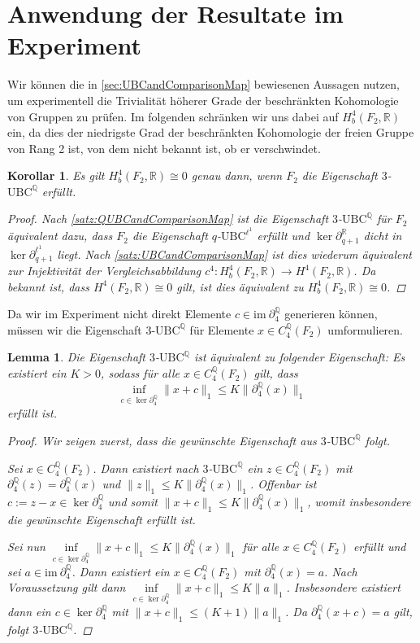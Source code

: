 \documentclass[a4paper,twoside,10pt]{scrreprt}
\newcommand {\img}{\text{im}~}
\newcommand{\Q}{\mathbb{Q}}
\newcommand{\R}{\mathbb{R}}
\newtheorem{lemma}[satz]{Lemma}
\newtheorem{korollar}[satz]{Korollar}
\theoremstyle{definition}
\begin{document}
\section{Anwendung der Resultate im Experiment}
Wir können die in \cref{sec:UBCandComparisonMap} bewiesenen Aussagen nutzen, um experimentell die Trivialität höherer Grade der beschränkten Kohomologie von Gruppen zu prüfen. Im folgenden schränken wir uns dabei auf $H_b^4(F_2,\R)$ ein, da dies der niedrigste Grad der beschränkten Kohomologie der freien Gruppe von Rang 2 ist, von dem nicht bekannt ist, ob er verschwindet.
\begin{korollar} 
Es gilt $H_b^4(F_2,\R)\cong 0$ genau dann, wenn $F_2$ die Eigenschaft $3$-$\text{UBC}^{\Q}$ erfüllt.
\begin{proof}
Nach \cref{satz:QUBCandComparisonMap} ist die Eigenschaft $3$-$\text{UBC}^{\Q}$ für $F_2$ äquivalent dazu, dass $F_2$ die Eigenschaft $q$-$\text{UBC}^{\ell^1}$ erfüllt und $\ker \partial_{q+1}^{\R}$ dicht in $\ker \partial_{q+1}^{\ell^1}$ liegt. Nach \cref{satz:UBCandComparisonMap} ist dies wiederum äquivalent zur Injektivität der Vergleichsabbildung $c^4:H_b^4(F_2,\R)\to H^4(F_2,\R)$. Da bekannt ist, dass $H^4(F_2,\R)\cong 0$ gilt, ist dies äquivalent zu $H_b^4(F_2,\R)\cong 0$.
\end{proof}
\end{korollar}
Da wir im Experiment nicht direkt Elemente $c\in\img\partial_4^{\Q}$ generieren können, müssen wir die Eigenschaft $3$-$\text{UBC}^{\Q}$ für Elemente $x\in C_4^{\Q}(F_2)$ umformulieren. 
\begin{lemma}
Die Eigenschaft $3$-$\text{UBC}^{\Q}$ ist äquivalent zu folgender Eigenschaft:
Es existiert ein $K>0$, sodass für alle $x\in C_4^{\Q}(F_2)$ gilt, dass 
\begin{equation*}
\inf\limits_{c\in\ker\partial_4^{\Q}}\|x+c\|_1\leq K\|\partial_4^{\Q}(x)\|_1
\end{equation*}
erfüllt ist.
\begin{proof}
Wir zeigen zuerst, dass die gewünschte Eigenschaft aus $3$-$\text{UBC}^{\Q}$ folgt.\par
Sei $x\in C_4^{\Q}(F_2)$. Dann existiert nach $3$-$\text{UBC}^{\Q}$ ein $z\in C_4^{\Q}(F_2)$ mit $\partial_4^{\Q}(z)=\partial_4^{\Q}(x)$ und $\|z\|_1\leq K\|\partial_4^{\Q}(x)\|_1$. Offenbar ist $c:=z-x\in\ker\partial_4^{\Q}$ und somit $\|x+c\|_1\leq K\|\partial_4^{\Q}(x)\|_1$, womit insbesondere die gewünschte Eigenschaft erfüllt ist.\par
Sei nun $\inf\limits_{c\in\ker\partial_4^{\Q}}\|x+c\|_1\leq K\|\partial_4^{\Q}(x)\|_1$ für alle $x\in C_4^{\Q}(F_2)$ erfüllt und sei $a\in\img\partial_4^{\Q}$. Dann existiert ein $x\in C_4^{\Q}(F_2)$ mit $\partial_4^{\Q}(x)=a$.
Nach Voraussetzung gilt dann $\inf\limits_{c\in\ker\partial_4^{\Q}}\|x+c\|_1\leq K\|a\|_1$. Insbesondere existiert dann ein $c\in\ker\partial_4^{\Q}$ mit $\|x+c\|_1\leq (K+1)\|a\|_1$. Da $\partial_4^{\Q}(x+c)=a$ gilt, folgt $3$-$\text{UBC}^{\Q}$. 
\end{proof}
\end{lemma}
\end{document}
